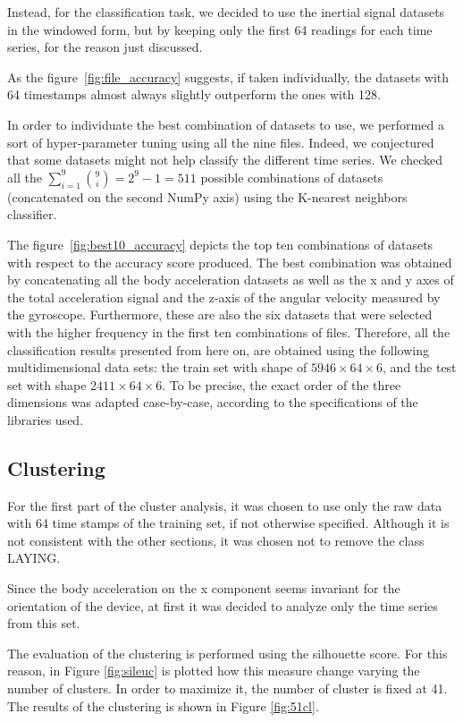 \documentclass[10pt, a4paper, twocolumn]{article}
\begin{document}
Instead, for the classification task, we decided to use the inertial signal datasets in the windowed form, but by keeping only the first 64 readings for each time series, for the reason just discussed. 

As the figure~\ref{fig:file_accuracy} suggests, if taken individually, the datasets with 64 timestamps almost always slightly outperform the ones with 128. 

In order to individuate the best combination of datasets to use, we performed a sort of hyper-parameter tuning using all the nine files. Indeed, we conjectured that some datasets might not help classify the different time series. We checked all the $\sum_{i=1}^{9}\binom{9}{i}=2^9-1=511$ possible combinations of datasets (concatenated on the second NumPy axis) using the K-nearest neighbors classifier.

The figure~\ref{fig:best10_accuracy} depicts the top ten combinations of datasets with respect to the accuracy score produced. The best combination was obtained by concatenating all the body acceleration datasets as well as the x and y axes of the total acceleration signal and the z-axis of the angular velocity measured by the gyroscope. Furthermore, these are also the six datasets that were selected with the higher frequency in the first ten combinations of files. Therefore, all the classification results presented from here on, are obtained using the following multidimensional data sets: the train set with shape of $5946 \times 64 \times 6$, and the test set with shape $2411 \times 64 \times 6$. To be precise, the exact order of the three dimensions was adapted case-by-case, according to the specifications of the libraries used. 


\subsection{Clustering}

For the first part of the cluster analysis, it was chosen to use only the raw data with 64 time stamps of the training set, if not otherwise specified. Although it is not consistent with the other sections, it was chosen not to remove the class LAYING.

Since the body acceleration on the x component seems invariant for the orientation of the device, at first it was decided to analyze only the time series from this set. 

The evaluation of the clustering is performed using the silhouette score. For this reason, in Figure \ref{fig:sileuc} is plotted how this measure change varying the number of clusters. In order to maximize it, the number of cluster is fixed at 41. The results of the clustering is shown in Figure \ref{fig:51cl}.
\end{document}
